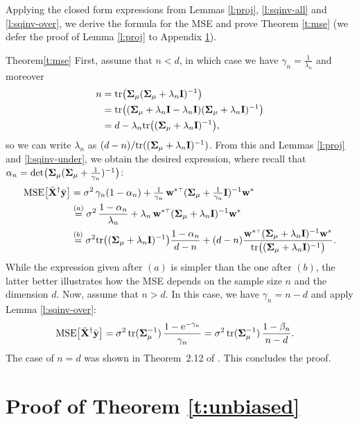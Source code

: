 Applying the closed form expressions from Lemmas
\ref{l:proj}, \ref{l:sqinv-all} and \ref{l:sqinv-over}, we derive
the formula for the MSE and prove Theorem \ref{t:mse} (we defer the
proof of Lemma \ref{l:proj} to Appendix \ref{s:unbiased-proof}).
\begin{proofof}{Theorem}{\ref{t:mse}}
  First, assume that $n<d$, in which case we have
  $\gamma_n=\frac1{\lambda_n}$ and moreover
  \begin{align*}
    n &= \mathrm{tr}\big(\mathbf{\Sigma}_\mu(\mathbf{\Sigma}_\mu+\lambda_n\mathbf I)^{-1}\big)\\
      &=\mathrm{tr}\big((\mathbf{\Sigma}_\mu+\lambda_n\mathbf I-\lambda_n\mathbf I)(\mathbf{\Sigma}_\mu+\lambda_n\mathbf I)^{-1}\big)\\
    &=d - \lambda_n\mathrm{tr}\big((\mathbf{\Sigma}_\mu+\lambda_n\mathbf I)^{-1}\big),
  \end{align*}
so we can write $\lambda_n$ as $(d-n)/\mathrm{tr}((\mathbf{\Sigma}_\mu+\lambda_n\mathbf I)^{-1})$.
  From this and Lemmas \ref{l:proj} and \ref{l:sqinv-under}, we
obtain the desired expression, where recall
  that $\alpha_n = \det\!\big(\mathbf{\Sigma}_\mu (\mathbf{\Sigma}_\mu+\frac1{\gamma_n})^{-1}\big)$:
  \begin{align*}
    \MSE{\Xb^\dagger\ybb} &= \sigma^2\,\gamma_n(1-\alpha_n) +
    \tfrac1{\gamma_n} \,\w^{*\top}(\Sigmab_\mu+\tfrac1{\gamma_n}\I)^{-1}\w^*
    \\
    &\overset{(a)}{=}\sigma^2\,\frac{1-\alpha_n}{\lambda_n} +
    \lambda_n\,\w^{*\top}(\Sigmab_\mu+\lambda_n\I)^{-1}\w^*\\
    &\overset{(b)}{=}\sigma^2\tr\big((\Sigmab_\mu+\lambda_n\I)^{-1}\big)\frac{1-\alpha_n}{d-n}
      +
      (d-n)\frac{\w^{*\top}(\Sigmab_\mu+\lambda_n\I)^{-1}\w^*}
      {\tr\big((\Sigmab_\mu+\lambda_n\I)^{-1}\big)}.
  \end{align*}
  While the expression given after $(a)$ is simpler than the one
after $(b)$, the latter better illustrates how the MSE depends on
the sample size $n$ and the dimension $d$.
  Now, assume that $n>d$. In this case, we have $\gamma_n=n-d$ and apply Lemma
  \ref{l:sqinv-over}:
  \begin{align*}
    {\mathrm{MSE}\big[{\bar{\mathbf X}}^\dagger\bar{\mathbf y}\big]}
    &= \sigma^2\,\mathrm{tr}(\mathbf{\Sigma}_\mu^{-1})\,
\frac{1-\mathrm{e}^{-\gamma_n}}{\gamma_n}
=\sigma^2\,\mathrm{tr}(\mathbf{\Sigma}_\mu^{-1})
\,\frac{1-\beta_n}{n-d}.
  \end{align*}
The case of $n=d$ was shown in Theorem~2.12 of \cite{correcting-bias-journal}.
This concludes the proof.
\end{proofof}

\section{Proof of Theorem \ref{t:unbiased}}
\label{s:unbiased-proof}

